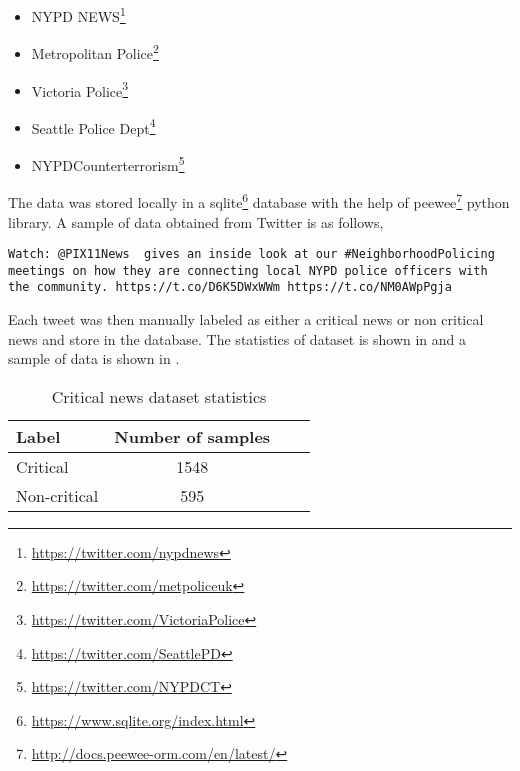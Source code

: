 \begin{itemize}
    \item NYPD NEWS\footnote{\url{https://twitter.com/nypdnews}}
    \item Metropolitan Police\footnote{\url{https://twitter.com/metpoliceuk}}
    \item  Victoria Police\footnote{\url{https://twitter.com/VictoriaPolice}}
    \item Seattle Police Dept\footnote{\url{https://twitter.com/SeattlePD}}
    \item NYPDCounterterrorism\footnote{\url{https://twitter.com/NYPDCT}}
\end{itemize}

The data was stored locally in a sqlite\footnote{\url{https://www.sqlite.org/index.html}} database with the help of peewee\footnote{\url{http://docs.peewee-orm.com/en/latest/}} python library. A sample of data obtained from Twitter is as follows,

\begin{verbatim}
Watch: @PIX11News  gives an inside look at our #NeighborhoodPolicing
meetings on how they are connecting local NYPD police officers with
the community. https://t.co/D6K5DWxWWm https://t.co/NM0AWpPgja
\end{verbatim}

Each tweet was then manually labeled as either a critical news or non critical news and store in the database. The statistics of dataset is shown in  and a sample of data is shown in .

\begin{table}
\begin{center}
\caption{Critical news dataset statistics}
\label{tbl:dataset_statistics}
\begin{tabular}{@{}lccc@{}}
\toprule 
Label&Number of samples\\
\midrule 
Critical&1548\\
Non-critical&595\\
\bottomrule
\end{tabular}
\end{center}
\end{table}

